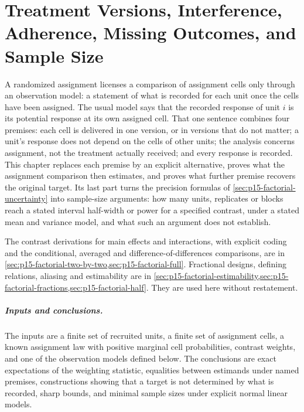 \chapter{Treatment Versions, Interference, Adherence, Missing Outcomes, and Sample Size}
\label{sec:p15-w02b-p15-076}

A randomized assignment licenses a comparison of assignment cells only
through an observation model: a statement of what is recorded for each unit
once the cells have been assigned. The usual model says that the recorded
response of unit \(i\) is its potential response at its own assigned cell.
That one sentence combines four premises: each cell is delivered in one
version, or in versions that do not matter; a unit's response does not
depend on the cells of other units; the analysis concerns assignment, not
the treatment actually received; and every response is recorded. This
chapter replaces each premise by an explicit alternative, proves what the
assignment comparison then estimates, and proves what further premise
recovers the original target. Its last part turns the precision formulas of
\cref{sec:p15-factorial-uncertainty} into sample-size arguments: how many
units, replicates or blocks reach a stated interval half-width or power for
a specified contrast, under a stated mean and variance model, and what
such an argument does not establish.

The contrast derivations for main effects and interactions, with explicit
coding and the conditional, averaged and difference-of-differences
comparisons, are in
\cref{sec:p15-factorial-two-by-two,sec:p15-factorial-full}. Fractional
designs, defining relations, aliasing and estimability are in
\cref{sec:p15-factorial-estimability,sec:p15-factorial-fractions,sec:p15-factorial-half}.
They are used here without restatement.

\paragraph{Inputs and conclusions.}
The inputs are a finite set of recruited units, a finite set of assignment
cells, a known assignment law with positive marginal cell probabilities,
contrast weights, and one of the observation models defined below. The
conclusions are exact expectations of the weighting statistic, equalities
between estimands under named premises, constructions showing that a
target is not determined by what is recorded, sharp bounds, and minimal
sample sizes under explicit normal linear models.

